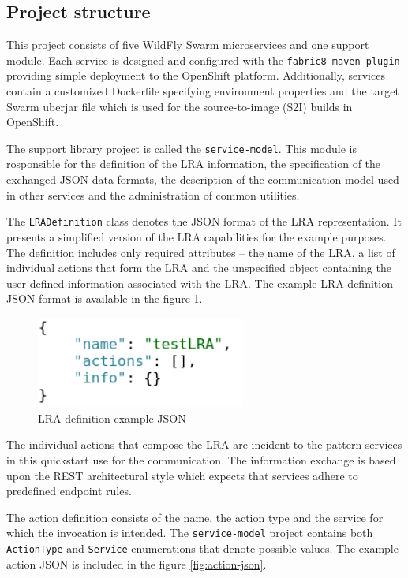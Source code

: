 \documentclass[oneside,
  digital, %
  table,   %
  nolof,     %
  nolot,     %
]{fithesis3}
\begin{document}
\subsection{Project structure}

This project consists of five WildFly Swarm microservices and one support module. Each service is designed and configured with the \texttt{fabric8-maven-plugin} providing simple deployment to the OpenShift platform. Additionally, services contain a customized Dockerfile specifying environment properties and the target Swarm uberjar file which is used for the source-to-image (S2I) builds in OpenShift.

The support library project is called the \texttt{service-model}. This module is rosponsible for the definition of the LRA information, the specification of the exchanged JSON data formats, the description of the communication model used in other services and the administration of common utilities.

The \texttt{LRADefinition} class denotes the JSON format of the LRA representation. It presents a simplified version of the LRA capabilities for the example purposes. The definition includes only required attributes -- the name of the LRA, a list of individual actions that form the LRA and the unspecified object containing the user defined information associated with the LRA. The example LRA definition JSON format is available in the figure \ref{fig:lra-json}.

\begin{figure}[h]
    \begin{center}
        \includegraphics[height=30mm]{images/LRADefinition.png}
    \end{center}
    \caption{LRA definition example JSON}
    \label{fig:lra-json}
\end{figure}

The individual actions that compose the LRA are incident to the pattern services in this quickstart use for the communication. The information exchange is based upon the REST architectural style which expects that services adhere to predefined endpoint rules. 

The action definition consists of the name, the action type and the service for which the invocation is intended. The \texttt{service-model} project contains both \texttt{ActionType} and \texttt{Service} enumerations that denote possible values. The example action JSON is included in the figure \ref{fig:action-json}.
\end{document}
